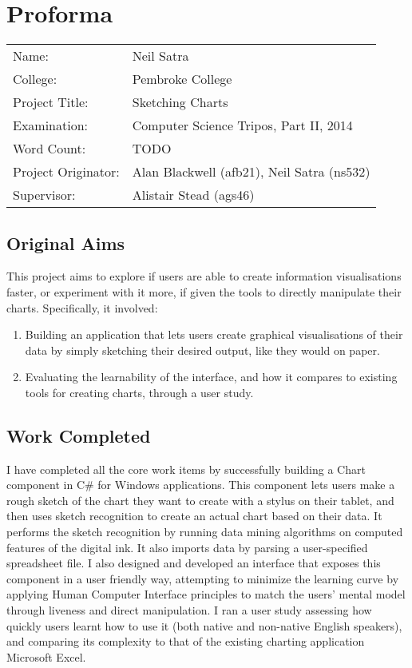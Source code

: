 \setcounter{page}{1}
\chapter*{Proforma}


\begin{tabular}{ll}
Name:               & Neil Satra					\\
College:            & Pembroke College				\\
Project Title:      & Sketching Charts				\\
Examination:        & Computer Science Tripos, Part II, 2014        \\
Word Count:         & TODO							\\
Project Originator: & Alan Blackwell (afb21), Neil Satra (ns532)        \\
Supervisor:         & Alistair Stead (ags46)				\\ 
\end{tabular}

\section*{Original Aims}
This project aims to explore if users are able to create information visualisations faster, or experiment with it more, if given the tools to directly manipulate their charts. Specifically, it involved:
\begin{enumerate}

	\item Building an application that lets users create graphical visualisations of their data by simply sketching their desired output, like they would on paper.

	\item Evaluating the learnability of the interface, and how it compares to existing tools for creating charts, through a user study.

\end{enumerate}

\section*{Work Completed}
I have completed all the core work items by successfully building a Chart component in C\# for Windows applications. This component lets users make a rough sketch of the chart they want to create with a stylus on their tablet, and then uses sketch recognition to create an actual chart based on their data. It performs the sketch recognition by running data mining algorithms on computed features of the digital ink. It also imports data by parsing a user-specified spreadsheet file. I also designed and developed an interface that exposes this component in a user friendly way, attempting to minimize the learning curve by applying Human Computer Interface principles to match the users' mental model through liveness and direct manipulation. I ran a user study assessing how quickly users learnt how to use it (both native and non-native English speakers), and comparing its complexity to that of the existing charting application Microsoft Excel.

